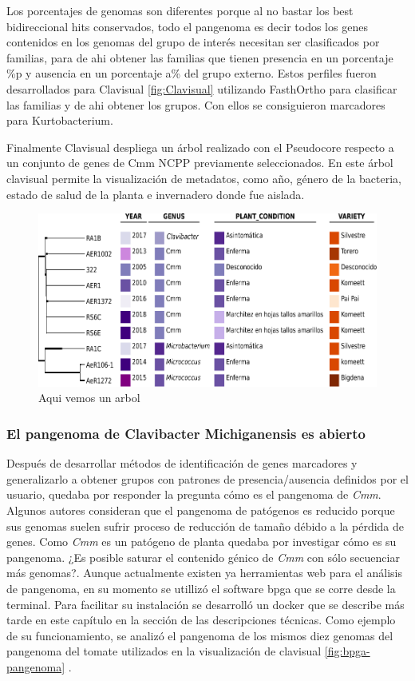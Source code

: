 \documentclass[]{article}
\begin{document}
Los porcentajes de genomas son diferentes porque al no bastar los best
bidireccional hits conservados, todo el pangenoma es decir todos los
genes contenidos en los genomas del grupo de interés necesitan ser
clasificados por familias, para de ahi obtener las familias que tienen
presencia en un porcentaje \%p y ausencia en un porcentaje a\% del grupo
externo. Estos perfiles fueron desarrollados para Clavisual
\autoref{fig:Clavisual} utilizando FasthOrtho para clasificar las
familias y de ahi obtener los grupos. Con ellos se consiguieron
marcadores para Kurtobacterium.

Finalmente Clavisual despliega un árbol realizado con el Pseudocore
respecto a un conjunto de genes de Cmm NCPP previamente seleccionados.
En este árbol clavisual permite la visualización de metadatos, como año,
género de la bacteria, estado de salud de la planta e invernadero donde
fue aislada.

\begin{figure}[h!tbp]
\centering
\includegraphics[angle = 0,scale = .7]{chapter1/Clavisual.pdf}
\caption[Clavisual organiza filogenéticamente cepas de $Clavibacter$ ]{\footnotesize{Aqui vemos un arbol}}
\label{fig:Clavisual}
\end{figure}

\subsubsection{El pangenoma de Clavibacter Michiganensis es
abierto}\label{el-pangenoma-de-clavibacter-michiganensis-es-abierto}

Después de desarrollar métodos de identificación de genes marcadores y
generalizarlo a obtener grupos con patrones de presencia/ausencia
definidos por el usuario, quedaba por responder la pregunta cómo es el
pangenoma de \emph{Cmm}. Algunos autores consideran que el pangenoma de
patógenos es reducido porque sus genomas suelen sufrir proceso de
reducción de tamaño débido a la pérdida de genes. Como \emph{Cmm} es un
patógeno de planta quedaba por investigar cómo es su pangenoma. ¿Es
posible saturar el contenido génico de \emph{Cmm} con sólo secuenciar
más genomas?. Aunque actualmente existen ya herramientas web para el
análisis de pangenoma, en su momento se utillizó el software bpga que se
corre desde la terminal. Para facilitar su instalación se desarrolló un
docker que se describe más tarde en este capítulo en la sección de las
descripciones técnicas. Como ejemplo de su funcionamiento, se analizó el
pangenoma de los mismos diez genomas del pangenoma del tomate utilizados
en la visualización de clavisual \autoref{fig:bpga-pangenoma} .
\end{document}
